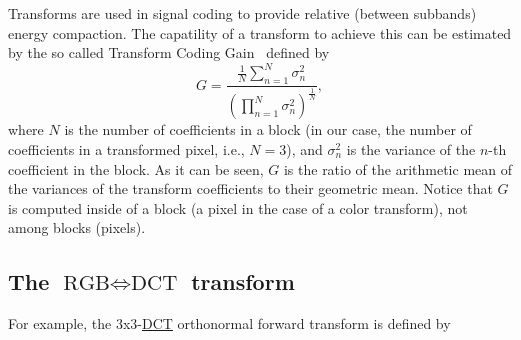 Transforms are used in signal coding to provide relative (between
subbands) energy compaction. The capatility of a transform to
achieve this can be estimated by the so called Transform Coding
Gain~\cite{vetterli1995wavelets,sayood2017introduction} defined by
\begin{equation}
G = \frac{\frac{1}{N}\sum_{n=1}^N{\sigma_n^2}}{(\prod_{n=1}^N\sigma_n^2)^{\frac{1}{N}}},
\end{equation}
where $N$ is the number of coefficients in a block (in our case, the
number of coefficients in a transformed pixel, i.e., $N=3$), and
$\sigma_n^2$ is the variance of the $n$-th coefficient in the
block. As it can be seen, $G$ is the ratio of the arithmetic mean of
the variances of the transform coefficients to their geometric
mean. Notice that $G$ is computed inside of a block (a pixel in the
case of a color transform), not among blocks (pixels).

\subsection{The $\text{RGB}\Leftrightarrow\text{DCT}$ transform}
For example, the 3x3-\href{https://en.wikipedia.org/wiki/Discrete_cosine_transform}{DCT} orthonormal forward transform is defined by

